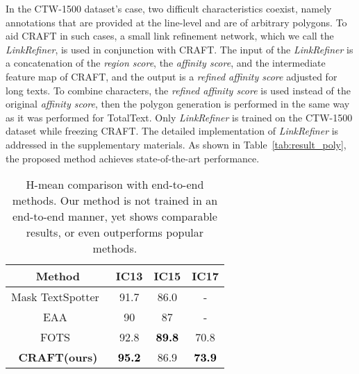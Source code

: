 \documentclass[10pt,twocolumn,letterpaper]{article}
\begin{document}
In the CTW-1500 dataset's case, two difficult characteristics coexist, namely annotations that are provided at the line-level and are of arbitrary polygons.
To aid CRAFT in such cases, a small link refinement network, which we call the \textit{LinkRefiner}, is used in conjunction with CRAFT. The input of the \textit{LinkRefiner} is a concatenation of the \textit{region score}, the \textit{affinity score}, and the intermediate feature map of CRAFT, and the output is a \textit{refined affinity score} adjusted for long texts. To combine characters, the \textit{refined affinity score} is used instead of the original \textit{affinity score}, then the polygon generation is performed in the same way as it was performed for TotalText. Only \textit{LinkRefiner} is trained on the CTW-1500 dataset while freezing CRAFT. The detailed implementation of \textit{LinkRefiner} is addressed in the supplementary materials.
As shown in Table~\ref{tab:result_poly}, the proposed method achieves state-of-the-art performance.














\begin{table}[t!]
  \centering
\tabcolsep=0.15cm
\renewcommand*{\arraystretch}{1.1}
  \begin{tabular}{c||c|c|c}
    \hline 
    \rule{0pt}{10pt} {\textbf{Method}} & {\textbf{IC13}} & {\textbf{IC15}} & {\textbf{IC17}}\\
\hline
    \hline
    \rule{0pt}{10pt}
    Mask TextSpotter~\cite{lyu2018mask} & 91.7 & 86.0 & - \\ 
    EAA~\cite{he2018end} & 90 & 87 & - \\ 
    FOTS~\cite{liu2018fots} & 92.8 & \textcolor{black}{\textbf{89.8}} &  70.8 \\ 
    \hline
    \hline
    \rule{0pt}{10pt} \textbf{CRAFT(ours)} & \textcolor{black}{\textbf{95.2}} & {86.9} & \textcolor{black}{\textbf{73.9}} \\
    \hline
  \end{tabular}
  \vspace{3mm}
  \caption{H-mean comparison with end-to-end methods. Our method is not trained in an end-to-end manner, yet shows comparable results, or even outperforms popular methods.} 
  \label{tab:result_endtoend}
\end{table}
\end{document}
